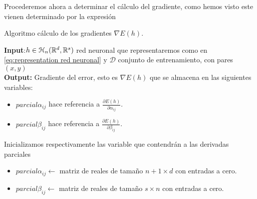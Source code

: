 Procederemos ahora a determinar el cálculo del gradiente, como hemos visto este vienen determinado por la expresión 


\begin{algorithm}[H]
    \caption{Algoritmo cálculo de los gradientes $\nabla E(h)$.}
    \hspace*{\algorithmicindent} \textbf{Input}:$h \in  \mathcal{H}_n(\mathbb{R}^d,\mathbb{R}^s)$ red neuronal que representaremos como en \ref{eq:representation red neuronal} y $\mathcal{D}$ conjunto de entrenamiento, con pares $(x, y)$ \\
    \hspace*{\algorithmicindent} \textbf{Output:} Gradiente del error, esto es $\nabla E(h)$ que se almacena en las siguientes variables: 
    \begin{itemize}
        \item $parcial \alpha_{i j}$ hace referencia a $\frac{\partial E(h)}{\partial \alpha_{i j}}$. 
   
        \item $parcial \beta _{i j}$ hace referencia a $\frac{\partial E(h)}{\partial \beta _{i j}}$. 
    \end{itemize} 
    \begin{algorithmic}[1]
        \STATE Inicializamos respectivamente las variable que contendrán a las derivadas parciales
        \begin{itemize}
            \item $parcial \alpha_{i j} \gets$ matriz de reales de tamaño $n+1 \times d$ con entradas a cero. 
            \item $parcial \beta_{i j} \gets$ matriz de reales de tamaño $s \times n$ con entradas a cero. 
        \end{itemize}
        \STATE {}
        

\end{algorithmic}
\end{algorithm}
